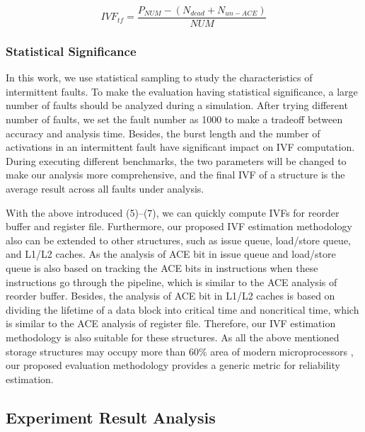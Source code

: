 \begin{equation} \label{eq:IVF-TF}
    IVF_{tf}=\frac{P_{NUM}-(N_{dead} + N_{un-ACE})}{NUM}
\end{equation}

\subsubsection{Statistical Significance}
In this work, we use statistical sampling to study the characteristics of intermittent faults. To make the evaluation having statistical significance, a large number of faults should be analyzed during a simulation. After trying different number of faults, we set the fault number as 1000 to make a tradeoff between accuracy and analysis time. Besides, the burst length and the number of activations in an intermittent fault have significant impact on IVF computation. During executing different benchmarks, the two parameters will be changed to make our analysis more comprehensive, and the final IVF of a structure is the average result across all faults under analysis.

With the above introduced (5)–(7), we can quickly compute IVFs for reorder buffer and register file. Furthermore, our proposed IVF estimation methodology also can be extended to other structures, such as issue queue, load/store queue, and L1/L2 caches. As the analysis of ACE bit in issue queue and load/store queue is also based on tracking the ACE bits in instructions when these instructions go through the pipeline, which is similar to the ACE analysis of reorder buffer. Besides, the analysis of ACE bit in L1/L2 caches is based on dividing the lifetime of a data block into critical time and noncritical time, which is similar to the ACE analysis of register file. Therefore, our IVF estimation methodology is also suitable for these structures. As all the above mentioned storage structures may occupy more than 60\% area of modern microprocessors \cite{Itanium_isscc08}, our proposed evaluation methodology provides a generic metric for reliability estimation.

\subsection{Experiment Result Analysis}
